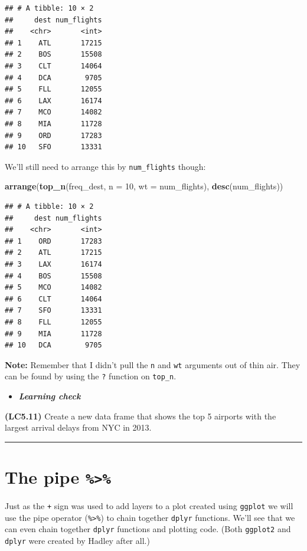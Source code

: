\documentclass[]{tufte-book}
\newenvironment{Shaded}{\begin{snugshade}}{\end{snugshade}}
\newcommand{\KeywordTok}[1]{\textcolor[rgb]{0.13,0.29,0.53}{\textbf{{#1}}}}
\newcommand{\DataTypeTok}[1]{\textcolor[rgb]{0.13,0.29,0.53}{{#1}}}
\newcommand{\DecValTok}[1]{\textcolor[rgb]{0.00,0.00,0.81}{{#1}}}
\newcommand{\NormalTok}[1]{{#1}}
\let\oldrule=\rule
\renewcommand{\rule}[1]{\oldrule{\linewidth}}
\newenvironment{rmdblock}[1]
  {\begin{shaded*}
  \begin{itemize}
  \renewcommand{\labelitemi}{
    \raisebox{-.7\height}[0pt][0pt]{
    }
  }
  \item
  }
  {
  \end{itemize}
  \end{shaded*}
  }
\newenvironment{learncheck}
  {\begin{rmdblock}{warning}}
  {\end{rmdblock}}
\begin{document}
\begin{verbatim}
## # A tibble: 10 × 2
##     dest num_flights
##    <chr>       <int>
## 1    ATL       17215
## 2    BOS       15508
## 3    CLT       14064
## 4    DCA        9705
## 5    FLL       12055
## 6    LAX       16174
## 7    MCO       14082
## 8    MIA       11728
## 9    ORD       17283
## 10   SFO       13331
\end{verbatim}

We'll still need to arrange this by \texttt{num\_flights} though:

\begin{Shaded}
\begin{Highlighting}[]
\KeywordTok{arrange}\NormalTok{(}\KeywordTok{top_n}\NormalTok{(freq_dest, }\DataTypeTok{n =} \DecValTok{10}\NormalTok{, }\DataTypeTok{wt =} \NormalTok{num_flights), }\KeywordTok{desc}\NormalTok{(num_flights))}
\end{Highlighting}
\end{Shaded}

\begin{verbatim}
## # A tibble: 10 × 2
##     dest num_flights
##    <chr>       <int>
## 1    ORD       17283
## 2    ATL       17215
## 3    LAX       16174
## 4    BOS       15508
## 5    MCO       14082
## 6    CLT       14064
## 7    SFO       13331
## 8    FLL       12055
## 9    MIA       11728
## 10   DCA        9705
\end{verbatim}

\textbf{Note:} Remember that I didn't pull the \texttt{n} and
\texttt{wt} arguments out of thin air. They can be found by using the
\texttt{?} function on \texttt{top\_n}.

\begin{learncheck}
\textbf{\emph{Learning check}}
\end{learncheck}

\textbf{(LC5.11)} Create a new data frame that shows the top 5 airports
with the largest arrival delays from NYC in 2013.

\begin{center}\rule{0.5\linewidth}{\linethickness}\end{center}

\section{\texorpdfstring{The pipe
\texttt{\%\textgreater{}\%}}{The pipe \%\textgreater{}\%}}\label{the-pipe}

Just as the \texttt{+} sign was used to add layers to a plot created
using \texttt{ggplot} we will use the pipe operator
(\texttt{\%\textgreater{}\%}) to chain together \texttt{dplyr}
functions. We'll see that we can even chain together \texttt{dplyr}
functions and plotting code. (Both \texttt{ggplot2} and \texttt{dplyr}
were created by Hadley after all.)
\end{document}
